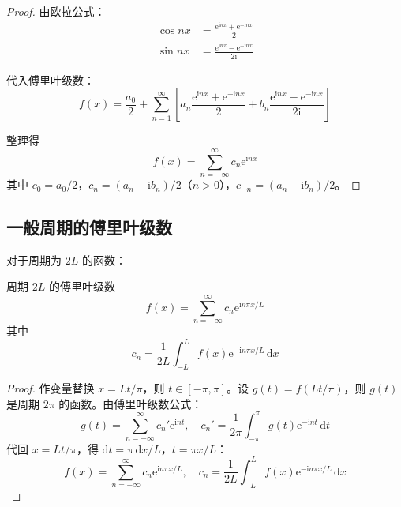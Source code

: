 \begin{proof}
由欧拉公式：
\begin{align}
    \cos nx &= \frac{\mathrm{e}^{\mathrm{i}nx} + \mathrm{e}^{-\mathrm{i}nx}}{2} \\
    \sin nx &= \frac{\mathrm{e}^{\mathrm{i}nx} - \mathrm{e}^{-\mathrm{i}nx}}{2\mathrm{i}}
\end{align}

代入傅里叶级数：
\begin{equation}
    f(x) = \frac{a_0}{2} + \sum_{n=1}^{\infty}\left[a_n\frac{\mathrm{e}^{\mathrm{i}nx} + \mathrm{e}^{-\mathrm{i}nx}}{2} + b_n\frac{\mathrm{e}^{\mathrm{i}nx} - \mathrm{e}^{-\mathrm{i}nx}}{2\mathrm{i}}\right]
\end{equation}

整理得
\begin{equation}
    f(x) = \sum_{n=-\infty}^{\infty} c_n\mathrm{e}^{\mathrm{i}nx}
\end{equation}
其中 $c_0 = a_0/2$，$c_n = (a_n - \mathrm{i}b_n)/2$（$n > 0$），$c_{-n} = (a_n + \mathrm{i}b_n)/2$。
\end{proof}

\subsection{一般周期的傅里叶级数}

对于周期为 $2L$ 的函数：

\begin{dingli}{}{周期 $2L$ 的傅里叶级数}
\begin{equation}
    f(x) = \sum_{n=-\infty}^{\infty} c_n\mathrm{e}^{\mathrm{i}n\pi x/L}
\end{equation}
其中
\begin{equation}
    c_n = \frac{1}{2L}\int_{-L}^{L} f(x)\mathrm{e}^{-\mathrm{i}n\pi x/L}\,\mathrm{d}x
\end{equation}
\end{dingli}

\begin{proof}
作变量替换 $x = Lt/\pi$，则 $t \in [-\pi, \pi]$。设 $g(t) = f(Lt/\pi)$，则 $g(t)$ 是周期 $2\pi$ 的函数。由傅里叶级数公式：
\begin{equation}
    g(t) = \sum_{n=-\infty}^{\infty} c_n' \mathrm{e}^{\mathrm{i}nt}, \quad c_n' = \frac{1}{2\pi}\int_{-\pi}^{\pi} g(t)\mathrm{e}^{-\mathrm{i}nt}\,\mathrm{d}t
\end{equation}
代回 $x = Lt/\pi$，得 $\mathrm{d}t = \pi\,\mathrm{d}x/L$，$t = \pi x/L$：
\begin{equation}
    f(x) = \sum_{n=-\infty}^{\infty} c_n \mathrm{e}^{\mathrm{i}n\pi x/L}, \quad c_n = \frac{1}{2L}\int_{-L}^{L} f(x)\mathrm{e}^{-\mathrm{i}n\pi x/L}\,\mathrm{d}x
\end{equation}
\end{proof}
